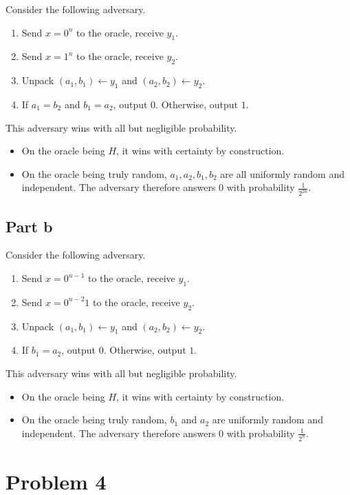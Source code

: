 \documentclass{article}
\theoremstyle{definition}
\begin{document}
Consider the following adversary.
\begin{enumerate}
    \item Send $x=0^n$ to the oracle, receive $y_1$.
    \item Send $x=1^n$ to the oracle, receive $y_2$.
    \item Unpack $(a_1, b_1)\gets y_1$ and $(a_2, b_2)\gets y_2$.
    \item If $a_1=b_2$ and $b_1=a_2$, output $0$. Otherwise, output $1$.
\end{enumerate}
This adversary wins with all but negligible probability.
\begin{itemize}
    \item On the oracle being $H$, it wins with certainty by construction.
    \item On the oracle being truly random, $a_1, a_2, b_1, b_2$ are all uniformly random and independent.
    The adversary therefore answers $0$ with probability $\frac{1}{2^{2n}}$.
\end{itemize}

\subsection*{Part b}

Consider the following adversary.
\begin{enumerate}
    \item Send $x=0^{n-1}$ to the oracle, receive $y_1$.
    \item Send $x=0^{n-2}1$ to the oracle, receive $y_2$.
    \item Unpack $(a_1, b_1)\gets y_1$ and $(a_2, b_2)\gets y_2$.
    \item If $b_1=a_2$, output $0$. Otherwise, output $1$.
\end{enumerate}
This adversary wins with all but negligible probability.
\begin{itemize}
    \item On the oracle being $H$, it wins with certainty by construction.
    \item On the oracle being truly random, $b_1$ and $a_2$ are uniformly random and independent.
    The adversary therefore answers $0$ with probability $\frac{1}{2^{n}}$.
\end{itemize}

\section*{Problem 4}
\end{document}
